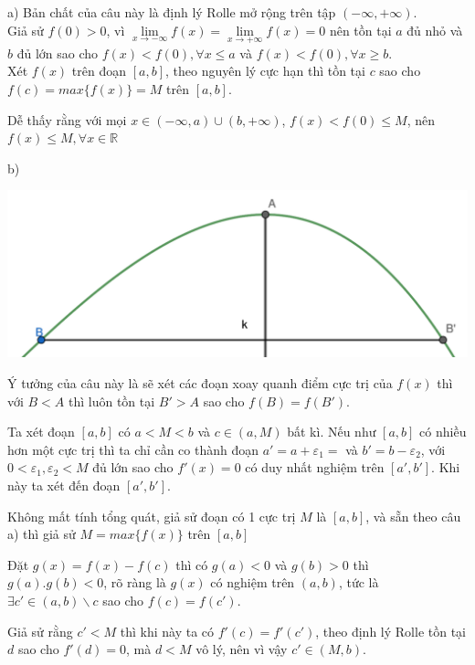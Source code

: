 \documentclass[11pt]{scrartcl}
\begin{document}
\begin{itemize}[label=, leftmargin=0em, itemsep=0.5em]
    \begin{sol}
        a) Bản chất của câu này là định lý Rolle mở rộng trên tập $(-\infty,+\infty)$. \\
        Giả sử $f(0) > 0$, vì $\underset{x\to -\infty }{\mathop{\lim }}f(x)=\underset{x\to +\infty }{\mathop{\lim }}f(x)=0$ nên tồn tại $a$ đủ nhỏ và $b$ đủ lớn sao cho $f(x) < f(0), \forall x \leq a$ và $f(x) < f(0), \forall x \geq b$.\\ Xét $f(x)$ trên đoạn $[a,b]$, theo nguyên lý cực hạn thì tồn tại $c$ sao cho $f(c) = max\{f(x)\} = M$ trên $[a,b]$. 
        
        
        Dễ thấy rằng với mọi $x \in (-\infty, a) \cup (b, +\infty)$, $f(x) < f(0) \leq M$, nên $f(x) \leq M, \forall x \in \mathbb{R}$


        b)
        \begin{center}
            \includegraphics[scale=0.4]{Image/2019.pdf}
        \end{center}
        Ý tưởng của câu này là sẽ xét các đoạn xoay quanh điểm cực trị của $f(x)$ thì với $B < A$ thì luôn tồn tại $B' > A$ sao cho $f(B)  = f(B')$.
        
        
        Ta xét đoạn $[a,b]$ có $a < M < b$ và $c \in (a,M)$ bất kì. Nếu như $[a,b]$ có nhiều hơn một cực trị thì ta chỉ cần co thành đoạn $a' = a + \varepsilon_1 = $ và $b' = b - \varepsilon_2$, với $0 < \varepsilon_1, \varepsilon_2 < M$ đủ lớn sao cho $f'(x) = 0$ có duy nhất nghiệm trên $[a',b']$. Khi này ta xét đến đoạn $[a',b']$. 
        
        
        Không mất tính tổng quát, giả sử đoạn có 1 cực trị $M$ là $[a,b]$, và sẵn theo câu a) thì giả sử $M = max\{f(x)\}$ trên $[a,b]$
        
        
        Đặt $g(x) = f(x) - f(c)$ thì có $g(a) < 0$ và $ g(b) > 0$ thì $g(a).g(b) < 0$, rõ ràng là $g(x)$ có nghiệm trên $(a,b)$, tức là $\exists c' \in (a,b)\backslash{c}$ sao cho $f(c) = f(c')$. 


        Giả sử rằng $c' < M$ thì khi này ta có $f'(c) = f'(c')$, theo định lý Rolle tồn tại $d$ sao cho $f'(d) = 0$, mà $d < M$ vô lý, nên vì vậy $c' \in (M,b)$. 
        

\end{sol}
\end{itemize}
\end{document}
